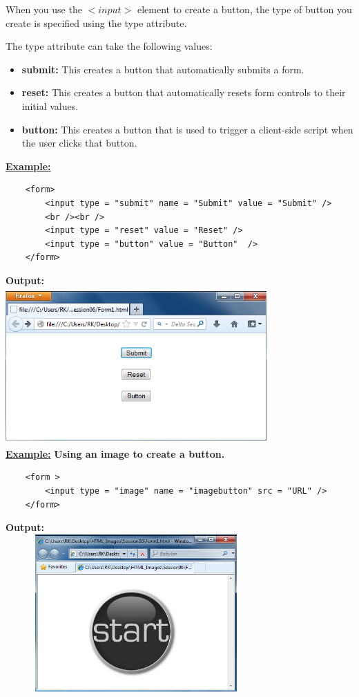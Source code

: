 \documentclass[11pt,a4paper]{article}
\begin{document}
When you use the $<input>$ element to create a button, the type of button you create is specified using the type attribute.

The type attribute can take the following values:
\begin{itemize}
\item \textbf{submit:} This creates a button that automatically submits a form.
\item \textbf{reset:} This creates a button that automatically resets form controls to their initial values.
\item \textbf{button:} This creates a button that is used to trigger a client-side script when the user clicks that button.
\end{itemize}


\underline{\textbf{Example:}}\\
\begin{verbatim}
    <form>
        <input type = "submit" name = "Submit" value = "Submit" />
        <br /><br />
        <input type = "reset" value = "Reset" />
        <input type = "button" value = "Button"  />
    </form>
\end{verbatim}

\textbf{Output:}\\
\includegraphics[height = 60mm, width = 100mm]{Form4.png}\\

\underline{\textbf{Example:}} \textbf{Using an image to create a button.}\\
\begin{verbatim}
    <form >
        <input type = "image" name = "imagebutton" src = "URL" />
    </form>
\end{verbatim}

\textbf{Output:}\\
\includegraphics[height = 60mm, width = 100mm]{Form5.png}
\end{document}
